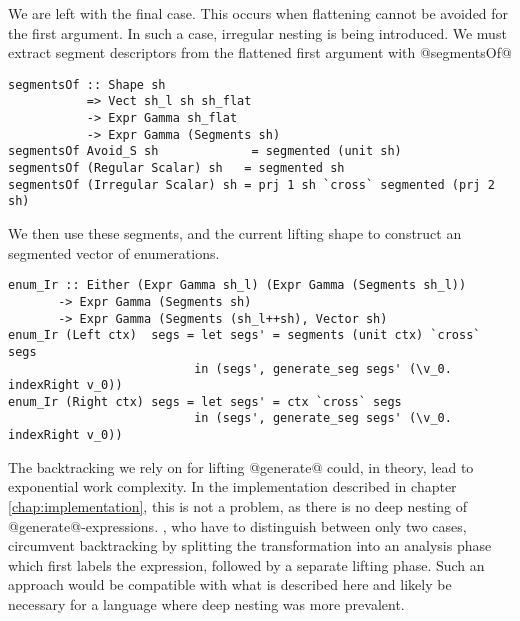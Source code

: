 We are left with the final case. This occurs when flattening cannot be avoided for the first argument. In such a case, irregular nesting is being introduced. We must extract segment descriptors from the flattened first argument with @segmentsOf@
%
\begin{lstlisting}[style=ndp]
segmentsOf :: Shape sh
           => Vect sh_l sh sh_flat
           -> Expr Gamma sh_flat
           -> Expr Gamma (Segments sh)
segmentsOf Avoid_S sh             = segmented (unit sh)
segmentsOf (Regular Scalar) sh   = segmented sh
segmentsOf (Irregular Scalar) sh = prj 1 sh `cross` segmented (prj 2 sh)
\end{lstlisting}
%
We then use these segments, and the current lifting shape to construct an segmented vector of enumerations.
\begin{lstlisting}[style=ndp]
enum_Ir :: Either (Expr Gamma sh_l) (Expr Gamma (Segments sh_l))
       -> Expr Gamma (Segments sh)
       -> Expr Gamma (Segments (sh_l++sh), Vector sh)
enum_Ir (Left ctx)  segs = let segs' = segments (unit ctx) `cross` segs
                          in (segs', generate_seg segs' (\v_0. indexRight v_0))
enum_Ir (Right ctx) segs = let segs' = ctx `cross` segs
                          in (segs', generate_seg segs' (\v_0. indexRight v_0))
\end{lstlisting}

The backtracking we rely on for lifting @generate@ could, in theory, lead to exponential work complexity. In the implementation described in chapter \ref{chap:implementation}, this is not a problem, as there is no deep nesting of @generate@-expressions. \citet{Keller:avoidance}, who have to distinguish between only two cases, circumvent backtracking by splitting the transformation into an analysis phase which first labels the expression, followed by a separate lifting phase. Such an approach would be compatible with what is described here and likely be necessary for a language where deep nesting was more prevalent.


